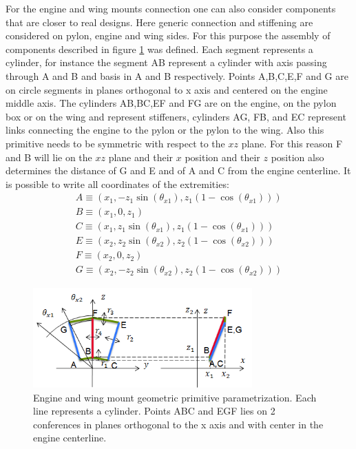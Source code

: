   For the engine and wing mounts connection one can also consider components that are closer to real designs. Here generic connection and stiffening are considered on pylon, engine and wing sides. For this purpose the assembly of components described in figure \ref{fig:3.42} was defined. Each segment represents a cylinder, for instance the segment AB represent a cylinder with axis passing through A and B and basis in A and B respectively. Points A,B,C,E,F and G are on circle segments in planes orthogonal to x axis and centered on the engine middle axis. The cylinders AB,BC,EF and FG are on the engine, on the pylon box or on the wing and represent stiffeners, cylinders AG, FB, and EC represent links  connecting the engine to the pylon or the pylon to the wing. Also this primitive needs to be symmetric with respect to the $xz$ plane. For this reason F and B will lie on the $xz$ plane and their $x$ position and their $z$ position also determines the distance of G and E and of A and C from the engine centerline. It is possible to write all coordinates of the extremities:
  \begin{eqnarray}
  A\equiv (x_1,-z_1\sin(\theta_{x1}),z_1(1-\cos(\theta_{x1})))\\
  B\equiv (x_1,0,z_1)\\
  C\equiv (x_1,z_1\sin(\theta_{x1}),z_1(1-\cos(\theta_{x1})))\\
  E\equiv (x_2,z_2\sin(\theta_{x2}),z_2(1-\cos(\theta_{x2})))\\
  F\equiv (x_2,0,z_2)\\
  G\equiv (x_2,-z_2\sin(\theta_{x2}),z_2(1-\cos(\theta_{x2})))
  \end{eqnarray}
   \begin{figure}[!ht]
         \centering
          \includegraphics[width=0.75\textwidth]{images/Ch3/engine_wing_mount_parametrization}
        \caption{Engine and wing mount geometric primitive parametrization. Each line represents a cylinder. Points ABC and EGF lies on 2 conferences in planes orthogonal to the x axis and with center in the engine centerline.}
        \label{fig:3.42}       %
   \end{figure}
